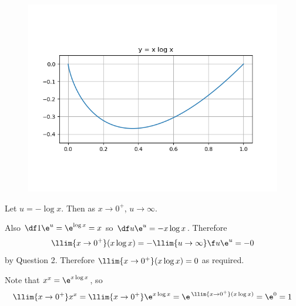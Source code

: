 \documentclass[a4paper]{article}
\begin{document}
\begin{figure}[h]
	\centering
	\includegraphics[scale=0.85]{xlogx}
\end{figure}

Let $u = -\log x$. Then as $x \to 0^+$, $u \to \infty$.

Also $\df1{\e^u} = \e^{\log x} = x$ so $\df u{\e^u} = -x \log x$. Therefore $$\llim{x \to 0^+} (x \log x) = -\llim{u \to \infty} \f u{\e^u} = -0$$ by Question 2. Therefore $\llim{x \to 0^+} (x \log x) = 0$ as required.

Note that $x^x = \e^{x \log x}$, so $$\llim{x \to 0^+} x^x = \llim{x \to 0^+} \e^{x \log x} = \e^{\,\llim{x \to 0^+} (x \log x)} = \e^0 = 1$$
\end{document}
